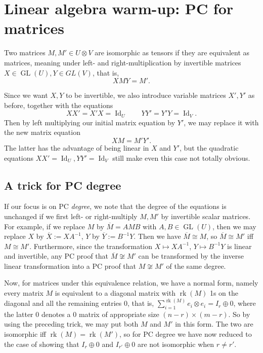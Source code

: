 \documentclass[10pt,a4paper]{article}
\theoremstyle{definition}
\DeclareMathOperator{\GL}{GL}
\DeclareMathOperator{\Id}{Id}
\DeclareMathOperator{\rk}{rk}
\begin{document}
\medskip






\section{Linear algebra warm-up: PC for matrices}
\label{sec:matrix}
Two matrices $M,M' \in U \otimes V$ are isomorphic as tensors if they are equivalent as matrices, meaning under left- and right-multiplication by invertible matrices $X \in \GL(U), Y \in GL(V)$, that is, 
\[
XMY = M'. 
\]

Since we want $X,Y$ to be invertible, we also introduce variable matrices $X', Y'$ as before, together with the equations
\[
XX' = X'X = \Id_U \qquad YY' = Y'Y = \Id_V.
\]
Then by left multiplying our initial matrix equation by $Y'$, we may replace it with the new matrix equation
\[
XM = M'Y'.
\]
The latter has the advantage of being linear in $X$ and $Y'$, but the quadratic equations $XX' =  \Id_U, YY' =  \Id_V$ still make even this case not totally obvious.

\subsection{A trick for PC degree} \label{sec:trick}
If our focus is on PC \emph{degree}, we note that the degree of the equations is unchanged if we first left- or right-multiply $M,M'$ by invertible scalar matrices. For example, if we replace $M$ by $\overline{M} = AMB$ with $A,B \in \GL(U)$, then we may replace $X$ by $\overline{X} := XA^{-1}$, $Y$ by $\overline{Y} := B^{-1} Y$. Then we have $\overline{M} \cong M$, so $\overline{M} \cong M'$ iff $M \cong M'$. Furthermore, since the transformation $X \mapsto XA^{-1}$, $Y \mapsto B^{-1} Y$ is linear and invertible, any PC proof that $\overline{M} \not\cong M'$ can be transformed by the inverse linear transformation into a PC proof that $M \not\cong M'$ of the same degree.

Now, for matrices under this equivalence relation, we have a normal form, namely every matrix $M$ is equivalent to a diagonal matrix with $\rk(M)$ 1s on the diagonal and all the remaining entries $0$, that is, $\sum_{i=1}^{\rk(M)} e_i \otimes e_i = I_r \oplus 0$, where the latter $0$ denotes a $0$ matrix of appropriate size $(n-r) \times (m-r)$. So by using the preceding trick, we may put both $M$ and $M'$ in this form. The two are isomorphic iff $\rk(M) = \rk(M')$, so for PC degree we have now reduced to the case of showing that $I_r \oplus 0$ and $I_{r'} \oplus 0$ are not isomorphic when $r \neq r'$. 
\end{document}

